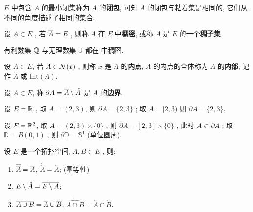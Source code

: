      \begin{Remark}
          $ E $ 中包含 $ A $ 的最小闭集称为 $ A $ 的\textbf{闭包}, 可知 $ A $ 的闭包与粘着集是相同的, 它们从不同的角度描述了相同的集合. 
     \end{Remark}
     \begin{Definition}[稠密]\label{def:稠密}
          设 $ A\subset E $ , 若 $ \baro{A}=E $ , 则称 $ A $ 在 $ E $ 中\textbf{稠密}, 或称 $ A $ 是 $ E $ 的一个\textbf{稠子集}
     \end{Definition}
     \begin{Example}
          有利数集 $ \Q $ 与无理数集 $ \mathbb{J} $ 都在 \R 中稠密. 
     \end{Example}
     \begin{Definition}[内部]\label{def:内部}
          设 $ A\subset E $, 若 $ A\in\CN{x} $ , 则称 $ x $ 是 $ A $ 的\textbf{内点},  $ A $ 的内点的全体称为 $ A $ 的\textbf{内部}, 记作 $ \mathring{A} $ 或 $ \mathrm{Int}(A) $.  
     \end{Definition}
     \begin{Definition}[边界]\label{def:边界}
          设 $ A\subset E $, 称 $ \partial A = \baro{A}\sm\mathring{A} $ 是 $ A $ 的\textbf{边界}.
     \end{Definition}
     \begin{Example}
          设 $ E=\R $ , 取 $ A = (2, 3) $, 则 $ \partial A = \{ 2, 3 \} $ ; 取 $ A = [2, 3) $ 则 $ \partial A = \{ 2, 3 \} $. 
          
          设 $ E = \R^{2} $, 取 $ A = (2, 3)\times \{0\} $ , 则 $ \partial A = [2, 3]\times \{0\} $ , 此时 $ A\subset \partial A $  ; 取 $ \mathbb{D}=B(0, 1) $ , 则 $ \partial \mathbb{D}=\mathbb{S}^{1} $ (单位圆周). 
     \end{Example}
     \begin{Theorem}\label{thm:闭包和内部的性质}
          设 $ E $ 是一个拓扑空间, $ A, B\subset E $ , 则:
          \begin{enumerate}[(1)]
               \item $ \baro{\baro{A}}=\baro{A} $, $ \mathring{\mathring{A}}=\mathring{A} $; (幂等性)
               \item $ E\sm\mathring{A}=\overline{E\sm A} $;
               \item \label{item:闭包内部}$ \overline {A\cup B}=\baro{A}\cup \baro{B} $; $ \mathring{\widehat{A\cap B}}=\mathring{A}\cap\mathring{B} $.   
          \end{enumerate}
     \end{Theorem}
